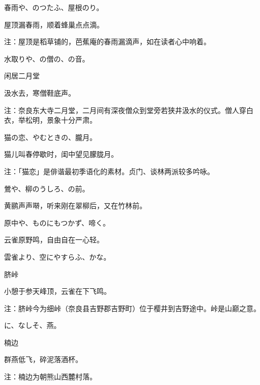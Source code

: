 \begin{haiku}
    {\FH 春雨や、のつたふ、屋根のり。}

    {\FK 屋顶漏春雨，顺着蜂巢点点滴。}

    {\FT 注：屋顶是稻草铺的，芭蕉庵的春雨漏滴声，如在读者心中响着。}
\end{haiku}

\begin{haiku}
    {\FH 水取りや、の僧の、の音。}

    {\FK 闲居二月堂}

    {\FK 汲水去，寒僧鞋底声。}

    {\FT 注：奈良东大寺二月堂，二月间有深夜僧众到堂旁若狭井汲水的仪式。僧人穿白衣，举松明，景象十分严肃。}
\end{haiku}

\begin{haiku}
    {\FH 猫の恋、やむときの、朧月。}

    {\FK 猫儿叫春停歇时，闺中望见朦胧月。}

    {\FT 注：「猫恋」是俳谐最初季语化的素材。贞门、谈林两派较多吟咏。}
\end{haiku}

\begin{haiku}
    {\FH 鶯や、柳のうしろ、の前。}

    {\FK 黄鹂声声啭，听来刚在翠柳后，又在竹林前。}
\end{haiku}

\begin{haiku}
    {\FH 原中や、ものにもつかず、啼く。}

    {\FK 云雀原野鸣，自由自在一心轻。}
\end{haiku}

\begin{haiku}
    {\FH 雲雀より、空にやすらふ、かな。}

    {\FK 脐峠}

    {\FK 小憩于参天峰顶，云雀在下飞鸣。}

    {\FT 注：脐峠今为细峠（奈良县吉野郡吉野町）位于樱井到吉野途中。峠是山巅之意。}
\end{haiku}

\begin{haiku}
    {\FH {}に、なしそ、燕。}

    {\FK 楠边}

    {\FK 群燕低飞，碎泥落酒杯。}

    {\FT 注：楠边为朝熊山西麓村落。}
\end{haiku}


